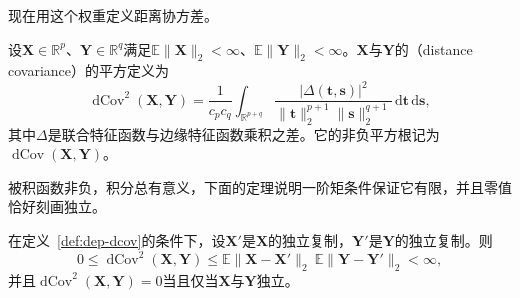 现在用这个权重定义距离协方差。

\begin{definition}[距离协方差]
\label{def:dep-dcov}
设$\bm{X}\in\mathbb{R}^{p}$、$\bm{Y}\in\mathbb{R}^{q}$满足$\mathbb{E}\lVert\bm{X}\rVert_2<\infty$、$\mathbb{E}\lVert\bm{Y}\rVert_2<\infty$。$\bm{X}$与$\bm{Y}$的（distance covariance）的平方定义为
\begin{equation}
  \operatorname{dCov}^{2}(\bm{X},\bm{Y})=\frac{1}{c_pc_q}\int_{\mathbb{R}^{p+q}}\frac{\lvert\Delta(\bm{t},\bm{s})\rvert^{2}}{\lVert\bm{t}\rVert_2^{p+1}\lVert\bm{s}\rVert_2^{q+1}}\,\mathrm{d}\bm{t}\,\mathrm{d}\bm{s},
  \label{eq:dep-dcov-def}
\end{equation}
其中$\Delta$是联合特征函数与边缘特征函数乘积之差。它的非负平方根记为$\operatorname{dCov}(\bm{X},\bm{Y})$。
\end{definition}

被积函数非负，积分总有意义，下面的定理说明一阶矩条件保证它有限，并且零值恰好刻画独立。

\begin{theorem}[距离协方差的有限性与零值]
\label{thm:dep-dcov-independence}
在定义~\ref{def:dep-dcov}的条件下，设$\bm{X}'$是$\bm{X}$的独立复制，$\bm{Y}'$是$\bm{Y}$的独立复制。则
\begin{equation}
  0\leq\operatorname{dCov}^{2}(\bm{X},\bm{Y})\leq\mathbb{E}\lVert\bm{X}-\bm{X}'\rVert_2\ \mathbb{E}\lVert\bm{Y}-\bm{Y}'\rVert_2<\infty ,
  \label{eq:dep-dcov-bound}
\end{equation}
并且$\operatorname{dCov}^{2}(\bm{X},\bm{Y})=0$当且仅当$\bm{X}$与$\bm{Y}$独立。
\end{theorem}

